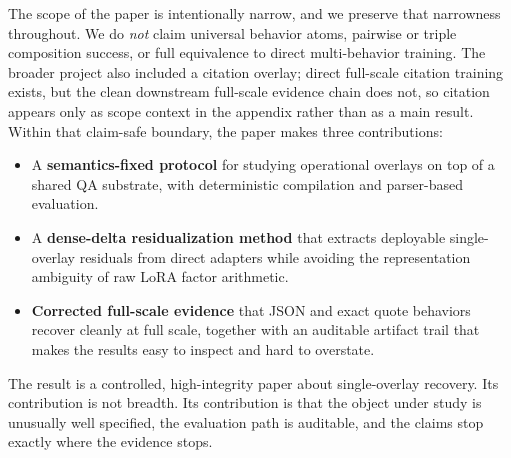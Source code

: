 The scope of the paper is intentionally narrow, and we preserve that narrowness throughout. We do \emph{not} claim universal behavior atoms, pairwise or triple composition success, or full equivalence to direct multi-behavior training. The broader project also included a citation overlay; direct full-scale citation training exists, but the clean downstream full-scale evidence chain does not, so citation appears only as scope context in the appendix rather than as a main result. Within that claim-safe boundary, the paper makes three contributions:

\begin{itemize}[leftmargin=1.25em]
    \item A \textbf{semantics-fixed protocol} for studying operational overlays on top of a shared QA substrate, with deterministic compilation and parser-based evaluation.
    \item A \textbf{dense-delta residualization method} that extracts deployable single-overlay residuals from direct adapters while avoiding the representation ambiguity of raw LoRA factor arithmetic.
    \item \textbf{Corrected full-scale evidence} that JSON and exact quote behaviors recover cleanly at full scale, together with an auditable artifact trail that makes the results easy to inspect and hard to overstate.
\end{itemize}

The result is a controlled, high-integrity paper about single-overlay recovery. Its contribution is not breadth. Its contribution is that the object under study is unusually well specified, the evaluation path is auditable, and the claims stop exactly where the evidence stops.
